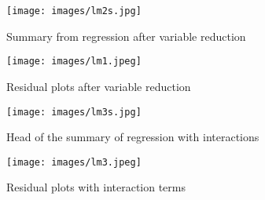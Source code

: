 \documentclass[10pt,twocolumn,letterpaper]{article}
\begin{document}
\begin{figure}
	\texttt{[image: images/lm2s.jpg]}
	\caption{Summary from regression after variable reduction}
	\label{fig:lm2s}
\end{figure}

\begin{figure}
	\texttt{[image: images/lm1.jpeg]}
	\caption{Residual plots after variable reduction}
	\label{fig:lm2c}
\end{figure}

\begin{figure}
	\texttt{[image: images/lm3s.jpg]}
	\caption{Head of the summary of regression with interactions}
	\label{fig:lm3s}
\end{figure}

\begin{figure}
	\texttt{[image: images/lm3.jpeg]}
	\caption{Residual plots with interaction terms}
	\label{fig:lm3c}
\end{figure}
\end{document}
